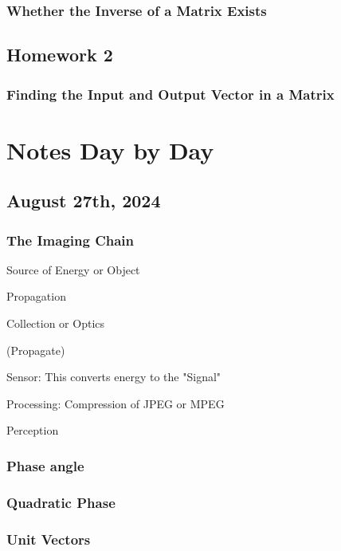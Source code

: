 \documentclass{article}
\begin{document}
\subsubsection{Whether the Inverse of a Matrix Exists}



\subsection{Homework 2}


\subsubsection{Finding the Input and Output Vector in a Matrix}






\section{Notes Day by Day}

\subsection{August 27th, 2024}
\subsubsection{The Imaging Chain} 

Source of Energy or Object

Propagation 

Collection or Optics 

(Propagate) 

Sensor: This converts energy to the "Signal"

Processing: Compression of JPEG or MPEG

Perception

\subsubsection{Phase angle}

\subsubsection{Quadratic Phase}

\subsubsection{Unit Vectors}
\end{document}
